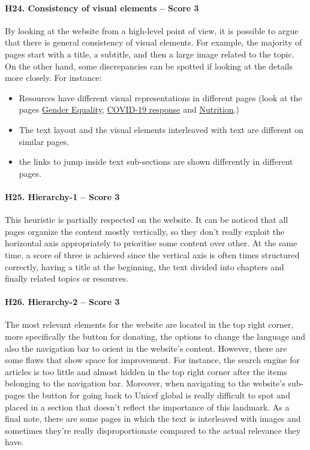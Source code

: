 \paragraph*{H24. Consistency of visual elements – Score 3}
By looking at the website from a high-level point of view, it is possible to argue that there is general consistency of visual elements. For example, the majority of pages start with a title, a subtitle, and then a large image related to the topic. On the other hand, some discrepancies can be spotted if looking at the details more closely. 
For instance:
\begin{itemize}
	\item Resources have different visual representations in different pages (look at the pages \href{https://www.unicef.org/gender-equality}{Gender Equality}, \href{https://www.unicef.org/coronavirus/covid-19}{COVID-19 response} and \href{https://www.unicef.org/nutrition}{Nutrition}.)
	\item The text layout and the visual elements interleaved with text are different on similar pages.
	\item the links to jump inside text sub-sections are shown differently in different pages.
\end{itemize}

\paragraph*{H25. Hierarchy-1 – Score 3}
This heuristic is partially respected on the website. It can be noticed that all pages organize the content mostly vertically, so they don't really exploit the horizontal axis appropriately to prioritise some content over other. At the same time, a score of three is achieved since the vertical axis is often times structured correctly, having a title at the beginning, the text divided into chapters and finally related topics or resources.


\paragraph*{H26. Hierarchy-2 – Score 3}
The most relevant elements for the website are located in the top right corner, more specifically the button for donating, the options to change the language and also the navigation bar to orient in the website's content.
However, there are some flaws that show space for improvement. For instance, the search engine for articles is too little and almost hidden in the top right corner after the items belonging to the navigation bar. Moreover, when navigating to the website's sub-pages the button for going back to Unicef global is really difficult to spot and placed in a section that doesn't reflect the importance of this landmark.
As a final note, there are some pages in which the text is interleaved with images and sometimes they're really disproportionate compared to the actual relevance they have.






